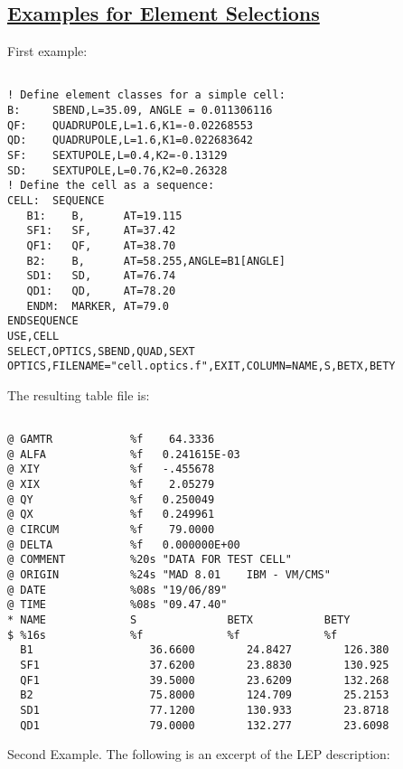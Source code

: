 \subsection{\href{example}{Examples for Element Selections}} First example: 
\begin{verbatim}

! Define element classes for a simple cell:
B:     SBEND,L=35.09, ANGLE = 0.011306116
QF:    QUADRUPOLE,L=1.6,K1=-0.02268553
QD:    QUADRUPOLE,L=1.6,K1=0.022683642
SF:    SEXTUPOLE,L=0.4,K2=-0.13129
SD:    SEXTUPOLE,L=0.76,K2=0.26328
! Define the cell as a sequence:
CELL:  SEQUENCE
   B1:    B,      AT=19.115
   SF1:   SF,     AT=37.42
   QF1:   QF,     AT=38.70
   B2:    B,      AT=58.255,ANGLE=B1[ANGLE]
   SD1:   SD,     AT=76.74
   QD1:   QD,     AT=78.20
   ENDM:  MARKER, AT=79.0
ENDSEQUENCE
USE,CELL
SELECT,OPTICS,SBEND,QUAD,SEXT
OPTICS,FILENAME="cell.optics.f",EXIT,COLUMN=NAME,S,BETX,BETY
\end{verbatim} The resulting table file is: 
\begin{verbatim}

@ GAMTR            %f    64.3336
@ ALFA             %f   0.241615E-03
@ XIY              %f   -.455678
@ XIX              %f    2.05279
@ QY               %f   0.250049
@ QX               %f   0.249961
@ CIRCUM           %f    79.0000
@ DELTA            %f   0.000000E+00
@ COMMENT          %20s "DATA FOR TEST CELL"
@ ORIGIN           %24s "MAD 8.01    IBM - VM/CMS"
@ DATE             %08s "19/06/89"
@ TIME             %08s "09.47.40"
* NAME             S              BETX           BETY
$ %16s             %f             %f             %f
  B1                  36.6600        24.8427        126.380
  SF1                 37.6200        23.8830        130.925
  QF1                 39.5000        23.6209        132.268
  B2                  75.8000        124.709        25.2153
  SD1                 77.1200        130.933        23.8718
  QD1                 79.0000        132.277        23.6098
\end{verbatim} Second Example. The following is an excerpt of the LEP description: 
